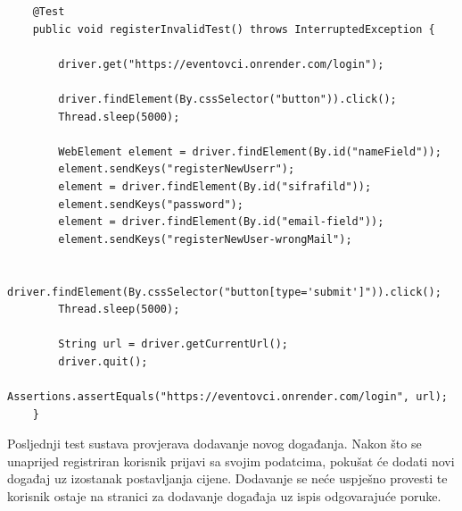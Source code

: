 \begin{lstlisting}
	@Test
	public void registerInvalidTest() throws InterruptedException {
		
		driver.get("https://eventovci.onrender.com/login");
		
		driver.findElement(By.cssSelector("button")).click();
		Thread.sleep(5000);
		
		WebElement element = driver.findElement(By.id("nameField"));
		element.sendKeys("registerNewUserr");
		element = driver.findElement(By.id("sifrafild"));
		element.sendKeys("password");
		element = driver.findElement(By.id("email-field"));
		element.sendKeys("registerNewUser-wrongMail");
		
		driver.findElement(By.cssSelector("button[type='submit']")).click();
		Thread.sleep(5000);
		
		String url = driver.getCurrentUrl();
		driver.quit();
		Assertions.assertEquals("https://eventovci.onrender.com/login", url);
	}
\end{lstlisting}

			Posljednji test sustava provjerava dodavanje novog događanja. Nakon što se unaprijed registriran korisnik prijavi sa svojim podatcima, pokušat će dodati novi događaj uz izostanak postavljanja cijene. Dodavanje se neće uspješno provesti te korisnik ostaje na stranici za dodavanje događaja uz ispis odgovarajuće poruke. 
			
